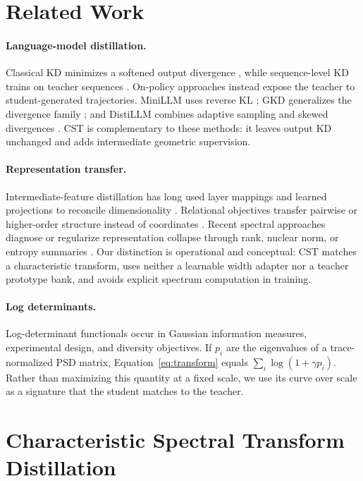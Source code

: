 \documentclass{article}
\newcommand{\cst}{\textsc{CST}}
\begin{document}
\section{Related Work}

\paragraph{Language-model distillation.}
Classical KD minimizes a softened output divergence
\citep{hinton2015distilling}, while sequence-level KD trains on teacher
sequences \citep{kim2016sequence}.  On-policy approaches instead expose the
teacher to student-generated trajectories.  MiniLLM uses reverse KL
\citep{gu2024minillm}; GKD generalizes the divergence family
\citep{agarwal2024gkd}; and DistiLLM combines adaptive sampling and skewed
divergences \citep{ko2024distillm}.  \cst{} is complementary to these methods:
it leaves output KD unchanged and adds intermediate geometric supervision.

\paragraph{Representation transfer.}
Intermediate-feature distillation has long used layer mappings and learned
projections to reconcile dimensionality \citep{romero2015fitnets,sun2019patient}.
Relational objectives transfer pairwise or higher-order structure instead of
coordinates \citep{park2019relational,tung2019similarity}.  Recent spectral
approaches diagnose or regularize representation collapse through rank,
nuclear norm, or entropy summaries \citep{roy2007effective,jing2022dimensional}.
Our distinction is operational and conceptual: \cst{} matches a
characteristic transform, uses neither a learnable width adapter nor a teacher
prototype bank, and avoids explicit spectrum computation in training.

\paragraph{Log determinants.}
Log-determinant functionals occur in Gaussian information measures,
experimental design, and diversity objectives.  If $p_i$ are the eigenvalues
of a trace-normalized PSD matrix, Equation~\ref{eq:transform} equals
$\sum_i\log(1+\gamma p_i)$.  Rather than maximizing this quantity at a fixed
scale, we use its curve over scale as a signature that the student matches to
the teacher.

\section{Characteristic Spectral Transform Distillation}
\end{document}
